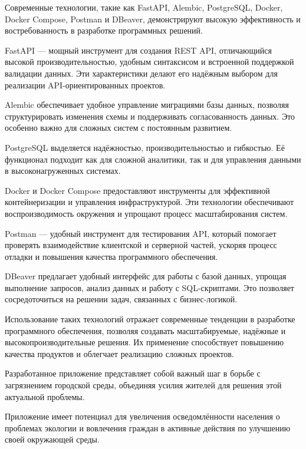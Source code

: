 \documentclass[pract]{SCWorks}
\begin{document}
\conclusion

Современные технологии, такие как FastAPI, Alembic, PostgreSQL, Docker, Docker 
Compose, Postman и DBeaver, демонстрируют высокую эффективность и 
востребованность в разработке программных решений.

FastAPI — мощный инструмент для создания REST API, отличающийся высокой 
производительностью, удобным синтаксисом и встроенной поддержкой валидации 
данных. Эти характеристики делают его надёжным выбором для реализации 
API-ориентированных проектов.

Alembic обеспечивает удобное управление миграциями базы данных, позволяя 
структурировать изменения схемы и поддерживать согласованность данных. 
Это особенно важно для сложных систем с постоянным развитием.

PostgreSQL выделяется надёжностью, производительностью и гибкостью. Её 
функционал подходит как для сложной аналитики, так и для управления данными 
в высоконагруженных системах.

Docker и Docker Compose предоставляют инструменты для эффективной 
контейнеризации и управления инфраструктурой. Эти технологии обеспечивают 
воспроизводимость окружения и упрощают процесс масштабирования систем.

Postman — удобный инструмент для тестирования API, который помогает 
проверять взаимодействие клиентской и серверной частей, ускоряя процесс 
отладки и повышения качества программного обеспечения.

DBeaver предлагает удобный интерфейс для работы с базой данных, упрощая 
выполнение запросов, анализ данных и работу с SQL-скриптами. Это позволяет 
сосредоточиться на решении задач, связанных с бизнес-логикой.

Использование таких технологий отражает современные тенденции в разработке 
программного обеспечения, позволяя создавать масштабируемые, надёжные и 
высокопроизводительные решения. Их применение способствует повышению качества 
продуктов и облегчает реализацию сложных проектов.

Разработанное приложение представляет собой важный шаг в борьбе 
с загрязнением городской среды, объединяя усилия жителей для решения этой 
актуальной проблемы.

Приложение имеет потенциал для увеличения осведомлённости населения о 
проблемах экологии и вовлечения граждан в активные действия по улучшению 
своей окружающей среды.

\nocite{*}



\end{document}
